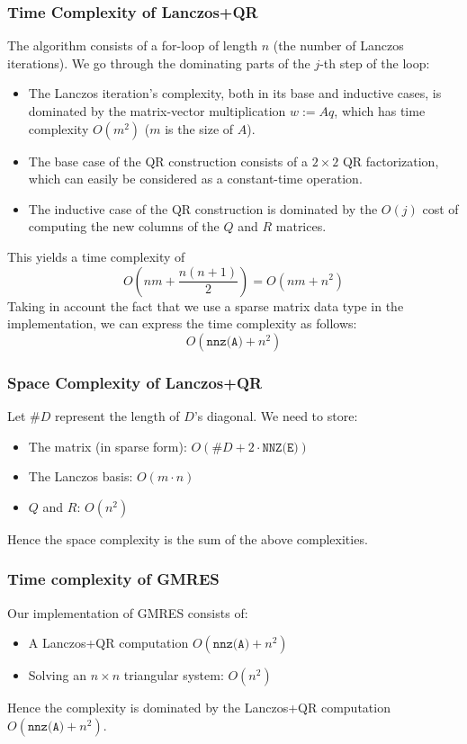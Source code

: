 \documentclass{article}
\begin{document}
\subsubsection{Time Complexity of Lanczos+QR}
The algorithm consists of a for-loop of length $n$ (the number of Lanczos iterations). We go through the dominating parts of the $j$-th step of the loop:
\begin{itemize}
 \item The Lanczos iteration's complexity, both in its base and inductive cases, is dominated by the matrix-vector multiplication $w := Aq$, which has time complexity $O(m^2)$ ($m$ is the size of $A$).
 \item The base case of the QR construction consists of a $2\times 2$ QR factorization, which can easily be considered as a constant-time operation.
 \item The inductive case of the QR construction is dominated by the $O(j)$ cost of computing the new columns of the $Q$ and $R$ matrices.
\end{itemize}
This yields a time complexity of
\[O \left(nm + \dfrac{n(n+1)}{2} \right) = O(nm + n^2)\]
Taking in account the fact that we use a sparse matrix data type in the implementation, we can express the time complexity as follows:
\[O(\texttt{nnz(A)} + n^2)\]
\subsubsection{Space Complexity of Lanczos+QR}
Let $\#D$ represent the length of $D$'s diagonal. We need to store:
\begin{itemize}
 \item The matrix (in sparse form): $O(\#D + 2\cdot \texttt{NNZ(E)})$
 \item The Lanczos basis: $O(m \cdot n)$
 \item $Q$ and $R$: $O(n^2)$
\end{itemize}
Hence the space complexity is the sum of the above complexities.

\subsubsection{Time complexity of GMRES}

Our implementation of GMRES consists of:
\begin{itemize}
 \item A Lanczos+QR computation $O(\texttt{nnz(A)} + n^2)$
 \item Solving an $n\times n$ triangular system: $O(n^2)$
\end{itemize}
Hence the complexity is dominated by the Lanczos+QR computation $O(\texttt{nnz(A)} + n^2)$.
\end{document}
